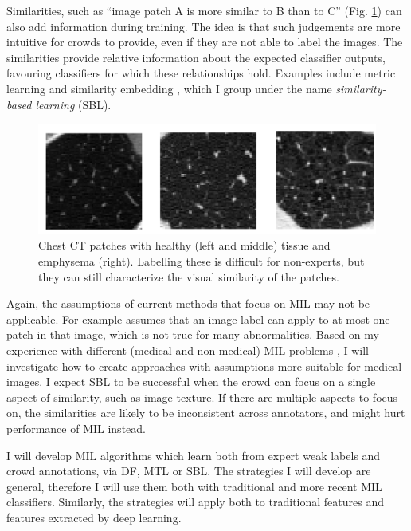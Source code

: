 \documentclass[serif, twocolumn, numeric, rga]{jote-article}
\begin{document}
Similarities, such as ``image patch A is more similar to B than to C'' (Fig. \ref{fig:chestct}) can also add information during training. The idea is that such judgements are more intuitive for crowds to provide, even if they are not able to label the images. The similarities provide relative information about the expected classifier outputs, favouring classifiers for which these relationships hold. Examples include metric learning \cite{Weinberger2009} and similarity embedding \cite{vanderMaaten2012a, Hoffer2015a}, which I group under the name \emph{similarity-based learning} (SBL).


\begin{figure}
\includegraphics[width=\columnwidth]{articles/RGAs/Veronika/tissue.png}
\caption{Chest CT patches with healthy (left and middle) tissue and emphysema (right). Labelling these is difficult for non-experts, but they can still characterize the visual similarity of the patches.}
\label{fig:chestct}
\end{figure}  

Again, the assumptions of current methods that focus on MIL may not be applicable. For example \cite{Law2017} assumes that an image label can apply to at most one patch in that image, which is not true for many abnormalities. Based on my experience with different (medical and non-medical) MIL problems \cite{Cheplygina2015a, Cheplygina2016}, I will investigate how to create approaches with assumptions more suitable for medical images. I expect SBL to be successful when the crowd can focus on a single aspect of similarity, such as image texture. If there are multiple aspects to focus on, the similarities are likely to be inconsistent across annotators, and might hurt performance of MIL instead.

I will develop MIL algorithms which learn both from expert weak labels and crowd annotations, via DF, MTL or SBL. The strategies I will develop are general, therefore I will use them both with traditional \cite{Chen2006, Andrews2002} and more recent \cite{Cheplygina2016, Carbonneau2018} MIL classifiers. Similarly, the strategies will apply both to traditional features and features extracted by deep learning.
\end{document}

